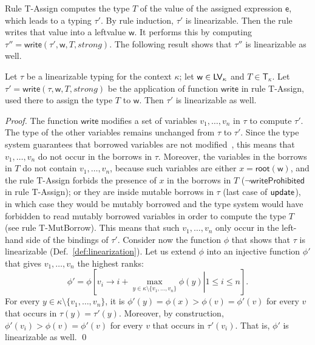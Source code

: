 Rule \textsf{T-Assign} computes the type $T$ of the value of the assigned expression
$\mathsf{e}$, which leads to a typing $\tau'$. By rule induction, $\tau'$ is
linearizable. Then the rule writes that value into a leftvalue $\mathsf{w}$.
It performs this by computing $\tau''=\mathsf{write}(\tau',\mathsf{w},T,\mathit{strong})$.
The following result shows that $\tau''$ is linearizable as well.

\begin{lemma}\label{lem:write_invariant}
  Let $\tau$ be a linearizable typing for the context $\kappa$;
  let $\mathsf{w}\in\mathsf{LV}_\kappa$ and $T\in\mathsf{T}_\kappa$.
  Let $\tau'=\mathsf{write}(\tau,\mathsf{w},T,\mathit{strong})$ be
  the application of function $\mathsf{write}$ in rule \textsf{T-Assign},
  used there to assign the type $T$ to $\mathsf{w}$.
  Then $\tau'$ is linearizable as well.
\end{lemma}
\begin{proof}
  The function $\mathsf{write}$ modifies a set of variables $v_1,\ldots,v_n$ in $\tau$ to compute $\tau'$.
  The type of the other variables remains unchanged from $\tau$ to $\tau'$. Since the
  type system guarantees that borrowed variables are not modified~\cite{Pearce21},
  this means that $v_1,\ldots,v_n$ do not occur in the borrows in $\tau$. Moreover,
  the variables in the borrows in $T$ do not contain $v_1,\ldots,v_n$, because
  such variables are either $x=\mathsf{root}(\mathsf{w})$, and the rule \textsf{T-Assign}
  forbids the presence of $x$ in the borrows in $T$ ($\neg\mathsf{writeProhibited}$ in rule
  \textsf{T-Assign}); or they are inside mutable borrows in $\tau$ (last case of
  $\mathsf{update}$), in which case they would be mutably borrowed and the type system
  would have forbidden to read mutably borrowed variables in order to compute
  the type $T$ (see rule \textsf{T-MutBorrow}).
  This means that such $v_1,\ldots,v_n$ only occur in the left-hand side of the bindings of $\tau'$.
  Consider now the function $\phi$ that shows that $\tau$ is linearizable
  (Def.~\ref{def:linearization}).
  Let us extend $\phi$ into an injective function $\phi'$
  that gives $v_1,\ldots,v_n$ the highest ranks:
  \[
  \phi'=\phi\left[\left.v_i\to i+\max\limits_{y\in\kappa\setminus\{v_1,\ldots,v_n\}}\phi(y)\right|1\le i\le n\right].
  \]
  For every $y\in\kappa\setminus\{v_1,\ldots,v_n\}$, it is
  $\phi'(y)=\phi(x)>\phi(v)=\phi'(v)$ for every $v$ that occurs in $\tau(y)=\tau'(y)$.
  Moreover, by construction, $\phi'(v_i)>\phi(v)=\phi'(v)$ for every $v$ that occurs in $\tau'(v_i)$.
  That is, $\phi'$ is linearizable as well.
  \qed
\end{proof}
